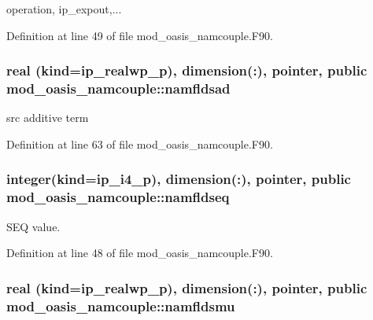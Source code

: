 operation, ip\+\_\+expout,... 



Definition at line 49 of file mod\+\_\+oasis\+\_\+namcouple.\+F90.

\hypertarget{classmod__oasis__namcouple_a1729dba99742412a1e07a479cb7f7921}{
\subsubsection[{namfldsad}]{\setlength{\rightskip}{0pt plus 5cm}real (kind=ip\+\_\+realwp\+\_\+p), dimension(\+:), pointer, public mod\+\_\+oasis\+\_\+namcouple\+::namfldsad}}\label{classmod__oasis__namcouple_a1729dba99742412a1e07a479cb7f7921}


src additive term 



Definition at line 63 of file mod\+\_\+oasis\+\_\+namcouple.\+F90.

\hypertarget{classmod__oasis__namcouple_a54ccfe0380fc1c89d085f37a044a297e}{
\subsubsection[{namfldseq}]{\setlength{\rightskip}{0pt plus 5cm}integer(kind=ip\+\_\+i4\+\_\+p), dimension(\+:), pointer, public mod\+\_\+oasis\+\_\+namcouple\+::namfldseq}}\label{classmod__oasis__namcouple_a54ccfe0380fc1c89d085f37a044a297e}


S\+E\+Q value. 



Definition at line 48 of file mod\+\_\+oasis\+\_\+namcouple.\+F90.

\hypertarget{classmod__oasis__namcouple_ab52824ec91491253e02556a68ab31b09}{
\subsubsection[{namfldsmu}]{\setlength{\rightskip}{0pt plus 5cm}real (kind=ip\+\_\+realwp\+\_\+p), dimension(\+:), pointer, public mod\+\_\+oasis\+\_\+namcouple\+::namfldsmu}}\label{classmod__oasis__namcouple_ab52824ec91491253e02556a68ab31b09}


